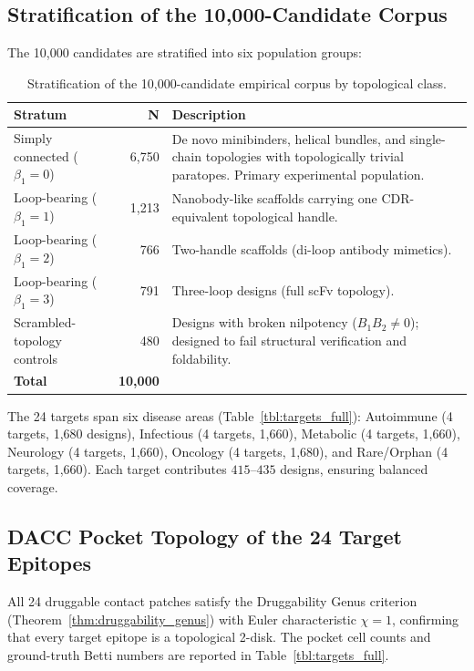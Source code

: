 \subsection{Stratification of the 10,000-Candidate Corpus}
\label{subsec:stratification}

The 10,000 candidates are stratified into six population groups:

\begin{table}[h!]
\centering
\small
\renewcommand{\arraystretch}{1.2}
\begin{tabular}{@{} l r p{8.5cm} @{}}
\toprule
\textbf{Stratum} & \textbf{N} & \textbf{Description} \\
\midrule
Simply connected ($\beta_1 = 0$) & 6,750 &
    De novo minibinders, helical bundles, and single-chain topologies with
    topologically trivial paratopes. Primary experimental population. \\
Loop-bearing ($\beta_1 = 1$) & 1,213 &
    Nanobody-like scaffolds carrying one CDR-equivalent topological handle. \\
Loop-bearing ($\beta_1 = 2$) & 766 &
    Two-handle scaffolds (di-loop antibody mimetics). \\
Loop-bearing ($\beta_1 = 3$) & 791 &
    Three-loop designs (full scFv topology). \\
Scrambled-topology controls & 480 &
    Designs with broken nilpotency ($B_1 B_2 \ne 0$); designed to fail
    structural verification and foldability. \\
\midrule
\textbf{Total} & \textbf{10,000} & \\
\bottomrule
\end{tabular}
\caption{Stratification of the 10,000-candidate empirical corpus by
         topological class.}
\label{tbl:stratification}
\end{table}

The 24 targets span six disease areas (Table~\ref{tbl:targets_full}):
Autoimmune (4 targets, 1,680 designs), Infectious (4 targets, 1,660),
Metabolic (4 targets, 1,660), Neurology (4 targets, 1,660), Oncology
(4 targets, 1,680), and Rare/Orphan (4 targets, 1,660).  Each target
contributes $415$--$435$ designs, ensuring balanced coverage.

\subsection{DACC Pocket Topology of the 24 Target Epitopes}
\label{subsec:pocket_topology}

All 24 druggable contact patches satisfy the Druggability Genus criterion
(Theorem~\ref{thm:druggability_genus}) with Euler characteristic $\chi = 1$,
confirming that every target epitope is a topological 2-disk.  The pocket
cell counts and ground-truth Betti numbers are reported in
Table~\ref{tbl:targets_full}.

